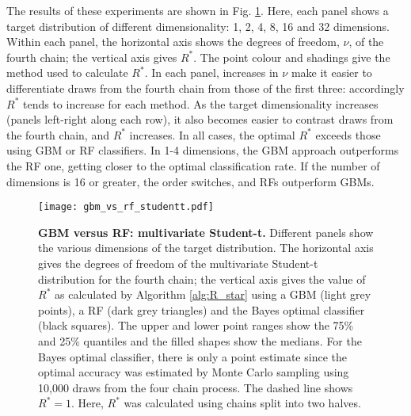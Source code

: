 \documentclass{article}
\begin{document}
The results of these experiments are shown in Fig. \ref{fig:gbm_vs_rf_studdentt}. Here, each panel shows a target distribution of different dimensionality: 1, 2, 4, 8, 16 and 32 dimensions. Within each panel, the horizontal axis shows the degrees of freedom, $\nu$, of the fourth chain; the vertical axis gives $R^*$. The point colour and shadings give the method used to calculate $R^*$. In each panel, increases in $\nu$ make it easier to differentiate draws from the fourth chain from those of the first three: accordingly $R^*$ tends to increase for each method. As the target dimensionality increases (panels left-right along each row), it also becomes easier to contrast draws from the fourth chain, and $R^*$ increases. In all cases, the optimal $R^*$ exceeds those using GBM or RF classifiers. In 1-4 dimensions, the GBM approach outperforms the RF one, getting closer to the optimal classification rate. If the number of dimensions is 16 or greater, the order switches, and RFs outperform GBMs.


\begin{figure}[!htb]
	\centerline{\texttt{[image: gbm\_vs\_rf\_studentt.pdf]}}
	\caption{\textbf{GBM versus RF: multivariate Student-t.} Different panels show the various dimensions of the target distribution. The horizontal axis gives the degrees of freedom of the multivariate Student-t distribution for the fourth chain; the vertical axis gives the value of $R^*$ as calculated by Algorithm \ref{alg:R_star} using a GBM (light grey points), a RF (dark grey triangles) and the Bayes optimal classifier (black squares). The upper and lower point ranges show the 75\% and 25\% quantiles and the filled shapes show the medians. For the Bayes optimal classifier, there is only a point estimate since the optimal accuracy was estimated by Monte Carlo sampling using 10,000 draws from the four chain process. The dashed line shows $R^*=1$. Here, $R^*$ was calculated using chains split into two halves.}
	\label{fig:gbm_vs_rf_studdentt}
\end{figure}
\color{black}


 
\end{document}

